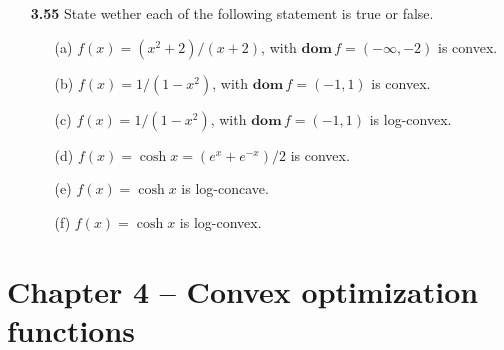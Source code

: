 \documentclass[11pt,a4paper]{article}
\begin{document}
\begin{itemize}
    \item[\textbf{3.55}] State wether each of the following statement is true or false.
    \item[] \begin{itemize}
        \item[(a)] $f(x) = (x^2 + 2)/(x + 2)$, with $\textbf{dom}\, f = (-\infty, -2)$ is convex.
        \item[(b)] $f(x) = 1/(1-x^2)$, with $\textbf{dom} \, f = (-1,1)$ is convex.
        \item[(c)] $f(x) = 1/(1-x^2)$, with $\textbf{dom} \, f = (-1,1)$ is log-convex.
        \item[(d)] $f(x) = \cosh x = (e^x + e^{-x})/2$ is convex.
        \item[(e)] $f(x) = \cosh x$ is log-concave.
        \item[(f)] $f(x) = \cosh x$ is log-convex.
    \end{itemize}
\end{itemize}

\section*{Chapter 4 -- Convex optimization functions}
\end{document}
